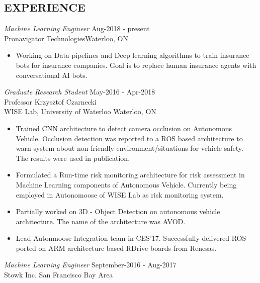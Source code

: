 \documentclass[margin, 10pt]{res} %
\begin{document}
\begin{resume}
\section{EXPERIENCE}


{\sl Machine Learning Engineer} \hfill Aug-2018 - present \\
Pronavigator Technologies\hfill Waterloo, ON

\begin{itemize} \itemsep -2pt %
\item Working on Data pipelines and Deep learning algorithms to train insurance bots for insurance companies. Goal is to replace human insurance agents with conversational AI bots.

\end{itemize}

{\sl Graduate Research Student} \hfill May-2016 - Apr-2018 \\
Professor Krzysztof Czarnecki \\
WISE Lab, University of Waterloo \hfill Waterloo, ON

\begin{itemize} \itemsep -2pt %
\item Trained CNN architecture to detect camera occlusion on Autonomous Vehicle. Occlusion detection was reported to a ROS based architecture to warn system about non-friendly environment/situations for vehicle safety. The results were used in publication.
\
\item Formulated a Run-time risk monitoring architecture for risk assessment in Machine Learning components of Autonomous Vehicle. Currently being employed in Autonomoose of WISE Lab as risk monitoring system.

\item Partially worked on 3D - Object Detection on autonomous vehicle architecture. The name of the architecture was AVOD.

\item Lead Autonmoose Integration team in CES'17. Successfully delivered ROS ported on ARM architecture based RDrive boards from Renesas.
\end{itemize}
 
 
{\sl Machine Learning Engineer} \hfill September-2016 - Aug-2017 \\
Stowk Inc.  \hfill San Francisco Bay Area



\end{resume}
\end{document}
